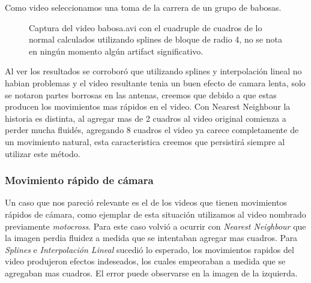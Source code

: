 Como video seleccionamos una toma de la carrera de un grupo de babosas.

\begin{figure}[H]
\centering
\begin{minipage}{0.60\textwidth}   
\end{minipage}\hfill
\caption{\footnotesize Captura del video babosa.avi con el cuadruple de cuadros de lo normal calculados utilizando splines de bloque de radio 4, no se nota en ningún momento algún artifact significativo.}
\end{figure}

Al ver los resultados se corroboró que utilizando splines y interpolación lineal no habian problemas y el video resultante tenia un buen efecto de camara lenta, solo se notaron partes borrosas en las antenas, creemos que debido a que estas producen los movimientos mas rápidos en el video. Con Nearest Neighbour la historia es distinta, al agregar mas de 2 cuadros al video original comienza a perder mucha fluidés, agregando 8 cuadros el video ya carece completamente de un movimiento natural, esta caracteristica creemos que persistirá siempre al utilizar este método.

\subsubsection{Movimiento rápido de cámara}

Un caso que nos pareció relevante es el de los videos que tienen movimientos rápidos de cámara, como ejemplar de esta situación utilizamos al video nombrado previamente \textit{motocross}. Para este caso volvió a ocurrir con \textit{Nearest Neighbour} que la imagen perdia fluidez a medida que se intentaban agregar mas cuadros. Para  \textit{Splines} e \textit{Interpolación Lineal}  sucedió lo esperado, los movimientos rapidos del video produjeron efectos indeseados, los cuales empeoraban a medida que se agregaban mas cuadros. El error puede observarse en la imagen de la izquierda.

